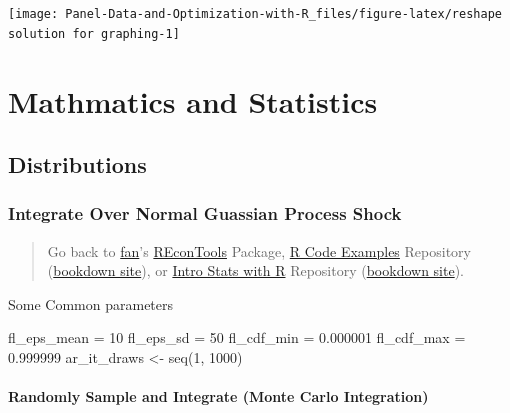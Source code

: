 \documentclass[
]{book}
\newenvironment{Shaded}{\begin{snugshade}}{\end{snugshade}}
\newcommand{\DecValTok}[1]{\textcolor[rgb]{0.00,0.00,0.81}{#1}}
\newcommand{\FloatTok}[1]{\textcolor[rgb]{0.00,0.00,0.81}{#1}}
\newcommand{\FunctionTok}[1]{\textcolor[rgb]{0.00,0.00,0.00}{#1}}
\newcommand{\NormalTok}[1]{#1}
\newcommand{\OtherTok}[1]{\textcolor[rgb]{0.56,0.35,0.01}{#1}}
\begin{document}
\begin{center}\texttt{[image: Panel-Data-and-Optimization-with-R\_files/figure-latex/reshape solution for graphing-1]} \end{center}

\hypertarget{mathmatics-and-statistics}{%
\chapter{Mathmatics and Statistics}\label{mathmatics-and-statistics}}

\hypertarget{distributions}{%
\section{Distributions}\label{distributions}}

\hypertarget{integrate-over-normal-guassian-process-shock}{%
\subsection{Integrate Over Normal Guassian Process Shock}\label{integrate-over-normal-guassian-process-shock}}

\begin{quote}
Go back to \href{http://fanwangecon.github.io/}{fan}'s \href{https://fanwangecon.github.io/REconTools/}{REconTools} Package, \href{https://fanwangecon.github.io/R4Econ/}{R Code Examples} Repository (\href{https://fanwangecon.github.io/R4Econ/bookdown}{bookdown site}), or \href{https://fanwangecon.github.io/Stat4Econ/}{Intro Stats with R} Repository (\href{https://fanwangecon.github.io/Stat4Econ/bookdown}{bookdown site}).
\end{quote}

Some Common parameters

\begin{Shaded}
\begin{Highlighting}[]
\NormalTok{fl\_eps\_mean }\OtherTok{=} \DecValTok{10}
\NormalTok{fl\_eps\_sd }\OtherTok{=} \DecValTok{50}
\NormalTok{fl\_cdf\_min }\OtherTok{=} \FloatTok{0.000001}
\NormalTok{fl\_cdf\_max }\OtherTok{=} \FloatTok{0.999999}
\NormalTok{ar\_it\_draws }\OtherTok{\textless{}{-}} \FunctionTok{seq}\NormalTok{(}\DecValTok{1}\NormalTok{, }\DecValTok{1000}\NormalTok{)}
\end{Highlighting}
\end{Shaded}

\hypertarget{randomly-sample-and-integrate-monte-carlo-integration}{%
\subsubsection{Randomly Sample and Integrate (Monte Carlo Integration)}\label{randomly-sample-and-integrate-monte-carlo-integration}}
\end{document}
